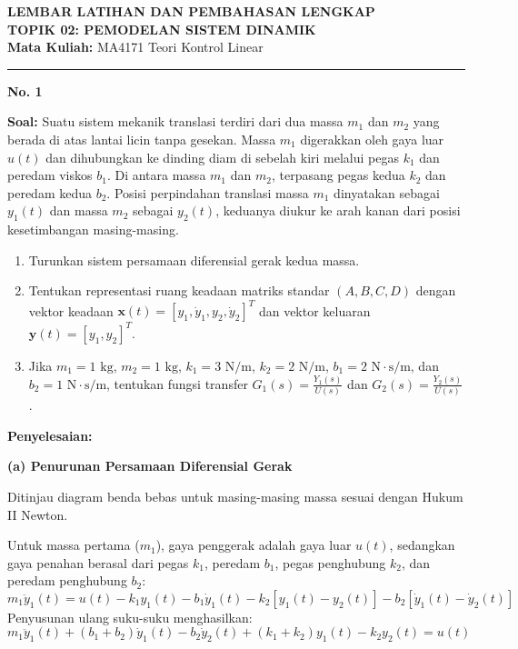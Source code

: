 \documentclass[11pt,a4paper]{article}
\begin{document}
\begin{center}
    {\Large \textbf{LEMBAR LATIHAN DAN PEMBAHASAN LENGKAP}}\\[4pt]
    {\large \textbf{TOPIK 02: PEMODELAN SISTEM DINAMIK}}\\[4pt]
    \textbf{Mata Kuliah:} MA4171 Teori Kontrol Linear
\end{center}
\hrule
\vspace{10pt}

\textbf{\large No. 1}

\textbf{Soal:}  
Suatu sistem mekanik translasi terdiri dari dua massa $m_1$ dan $m_2$ yang berada di atas lantai licin tanpa gesekan. Massa $m_1$ digerakkan oleh gaya luar $u(t)$ dan dihubungkan ke dinding diam di sebelah kiri melalui pegas $k_1$ dan peredam viskos $b_1$. Di antara massa $m_1$ dan $m_2$, terpasang pegas kedua $k_2$ dan peredam kedua $b_2$. Posisi perpindahan translasi massa $m_1$ dinyatakan sebagai $y_1(t)$ dan massa $m_2$ sebagai $y_2(t)$, keduanya diukur ke arah kanan dari posisi kesetimbangan masing-masing.
\begin{enumerate}[label=(\alph*)]
    \item Turunkan sistem persamaan diferensial gerak kedua massa.
    \item Tentukan representasi ruang keadaan matriks standar $(A, B, C, D)$ dengan vektor keadaan $\mathbf{x}(t) = [y_1, \dot{y}_1, y_2, \dot{y}_2]^T$ dan vektor keluaran $\mathbf{y}(t) = [y_1, y_2]^T$.
    \item Jika $m_1 = 1\text{ kg}$, $m_2 = 1\text{ kg}$, $k_1 = 3\text{ N/m}$, $k_2 = 2\text{ N/m}$, $b_1 = 2\text{ N}\cdot\text{s/m}$, dan $b_2 = 1\text{ N}\cdot\text{s/m}$, tentukan fungsi transfer $G_1(s) = \frac{Y_1(s)}{U(s)}$ dan $G_2(s) = \frac{Y_2(s)}{U(s)}$.
\end{enumerate}

\textbf{Penyelesaian:}

\textbf{(a) Penurunan Persamaan Diferensial Gerak}

Ditinjau diagram benda bebas untuk masing-masing massa sesuai dengan Hukum II Newton.

Untuk massa pertama ($m_1$), gaya penggerak adalah gaya luar $u(t)$, sedangkan gaya penahan berasal dari pegas $k_1$, peredam $b_1$, pegas penghubung $k_2$, dan peredam penghubung $b_2$:
$$m_1 \ddot{y}_1(t) = u(t) - k_1 y_1(t) - b_1 \dot{y}_1(t) - k_2 [y_1(t) - y_2(t)] - b_2 [\dot{y}_1(t) - \dot{y}_2(t)]$$
Penyusunan ulang suku-suku menghasilkan:
$$m_1 \ddot{y}_1(t) + (b_1 + b_2) \dot{y}_1(t) - b_2 \dot{y}_2(t) + (k_1 + k_2) y_1(t) - k_2 y_2(t) = u(t)$$
\end{document}

